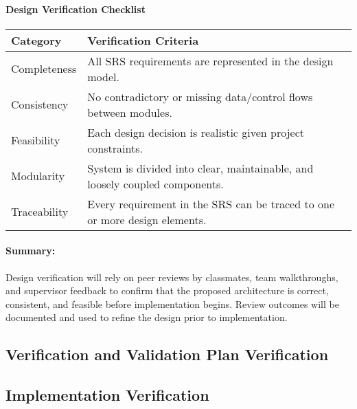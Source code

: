 \documentclass[12pt, titlepage]{article}
\begin{document}
\paragraph{Design Verification Checklist}
\begin{center}
\begin{tabular}{|p{4cm}|p{9cm}|}
\hline
\textbf{Category} & \textbf{Verification Criteria} \\ \hline
Completeness & All SRS requirements are represented in the design model. \\ \hline
Consistency & No contradictory or missing data/control flows between modules. \\ \hline
Feasibility & Each design decision is realistic given project constraints. \\ \hline
Modularity & System is divided into clear, maintainable, and loosely coupled components. \\ \hline
Traceability & Every requirement in the SRS can be traced to one or more design elements. \\ \hline
\end{tabular}
\end{center}

\paragraph{Summary:}
Design verification will rely on peer reviews by classmates, team walkthroughs, and supervisor feedback to confirm that the proposed architecture is correct, consistent, and feasible before implementation begins. Review outcomes will be documented and used to refine the design prior to implementation.

\subsection{Verification and Validation Plan Verification}




\subsection{Implementation Verification}
\end{document}
